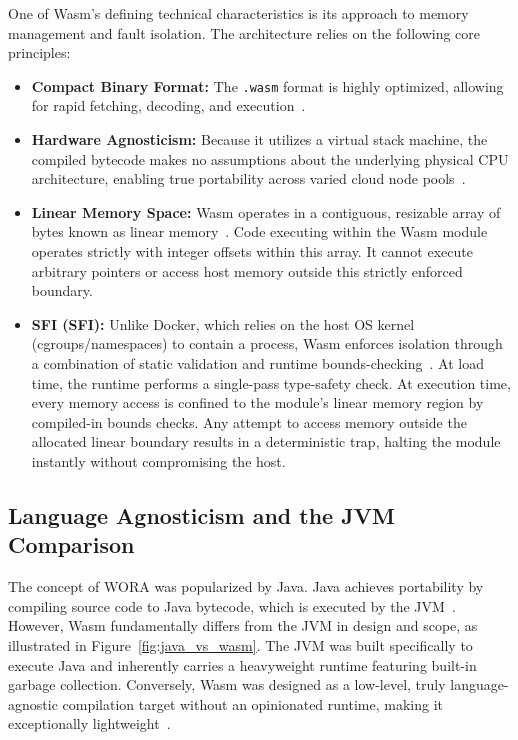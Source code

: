 One of \acs{Wasm}'s defining technical characteristics is its approach to memory management and fault isolation. The architecture relies on the following core principles:
\begin{itemize}
    \item \begin{sloppypar}\textbf{Compact Binary Format:} The \texttt{.wasm} format is highly optimized, allowing for rapid fetching, decoding, and execution~\cite{haas2017bringing}.\end{sloppypar}
    \item \textbf{Hardware Agnosticism:} Because it utilizes a virtual stack machine, the compiled bytecode makes no assumptions about the underlying physical \acs{CPU} architecture, enabling true portability across varied cloud node pools~\cite{haas2017bringing}.
    \item \textbf{Linear Memory Space:} \acs{Wasm} operates in a contiguous, resizable array of bytes known as linear memory~\cite{haas2017bringing}. Code executing within the \acs{Wasm} module operates strictly with integer offsets within this array. It cannot execute arbitrary pointers or access host memory outside this strictly enforced boundary.
    \item \textbf{\acl{SFI} (\acs{SFI}):} Unlike Docker, which relies on the host \acs{OS} kernel (cgroups/namespaces) to contain a process, \acs{Wasm} enforces isolation through a combination of static validation and runtime bounds-checking~\cite{haas2017bringing, wahbe1993sfi}. At load time, the runtime performs a single-pass type-safety check. At execution time, every memory access is confined to the module's linear memory region by compiled-in bounds checks. Any attempt to access memory outside the allocated linear boundary results in a deterministic trap, halting the module instantly without compromising the host.
\end{itemize}

\subsection{Language Agnosticism and the JVM Comparison}
The concept of \ac{WORA} was popularized by Java. Java achieves portability by compiling source code to Java bytecode, which is executed by the \ac{JVM}~\cite{chiarlone2024serverside}. However, \acs{Wasm} fundamentally differs from the \acs{JVM} in design and scope, as illustrated in Figure~\ref{fig:java_vs_wasm}. The \acs{JVM} was built specifically to execute Java and inherently carries a heavyweight runtime featuring built-in garbage collection. Conversely, \acs{Wasm} was designed as a low-level, truly language-agnostic compilation target without an opinionated runtime, making it exceptionally lightweight~\cite{haas2017bringing}.

